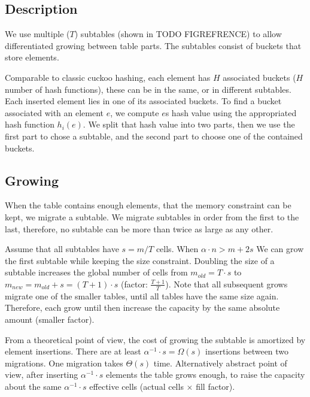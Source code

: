 \documentclass[a4paper,UKenglish]{lipics-v2016}
\begin{document}
\subsection{Description}
We use multiple ($T$) subtables (shown in TODO FIGREFRENCE) to allow
differentiated growing between table parts.  The subtables consist of
buckets that store elements.

Comparable to classic cuckoo hashing, each element has $H$ associated
buckets ($H$ number of hash functions), these can be in the same, or
in different subtables.  Each inserted element lies in one of its
associated buckets.  To find a bucket associated with an
element $e$, we compute $e$s hash value using the appropriated hash function
$h_i(e)$. We split that hash value into two parts, then we use the
first part to chose a subtable, and the second part to
choose one of the contained buckets.


\subsection{Growing}
When the table contains enough elements, that the memory constraint
can be kept, we migrate a subtable.  We migrate subtables in order
from the first to the last, therefore, no subtable can be more than
twice as large as any other.

Assume that all subtables have $s=m/T$ cells. When $\alpha\cdot n >
m+2s$ We can grow the first subtable while keeping the size
constraint.  Doubling the size of a subtable increases the global
number of cells from $m_{old} = T\cdot s$ to $m_{new} = m_{old}+s =
(T+1)\cdot s$ (factor: $\frac{T+1}{T}$).  Note that all subsequent
grows migrate one of the smaller tables, until all tables have the
same size again.  Therefore, each grow until then increase the
capacity by the same absolute amount (smaller factor).

From a theoretical point of view, the cost of growing the subtable is
amortized by element insertions.  There are at least $\alpha^{-1}
\cdot s = \Omega(s)$ insertions between two migrations.  One migration
takes $\Theta(s)$ time. Alternatively abstract point of view, after
inserting $\alpha^{-1} \cdot s$ elements the table grows enough, to
raise the capacity about the same $\alpha^{-1} \cdot s$ effective
cells (actual cells $\times$ fill factor).
\end{document}
